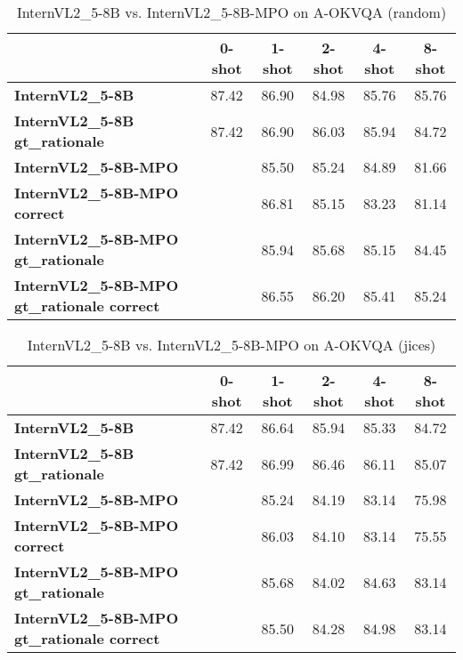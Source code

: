 \begin{table}
\caption{InternVL2\_5-8B vs. InternVL2\_5-8B-MPO on A-OKVQA (random)}
\label{tab:InternVL2_5-8B_A-OKVQA_TRAIN_random}
\begin{tabular}{lccccc}
\toprule
 & 0-shot & 1-shot & 2-shot & 4-shot & 8-shot \\
\midrule
\textbf{InternVL2\_5-8B} & 87.42 & 86.90 & 84.98 & 85.76 & 85.76 \\
\textbf{InternVL2\_5-8B gt\_rationale} & 87.42 & 86.90 & 86.03 & 85.94 & 84.72 \\
\textbf{InternVL2\_5-8B-MPO} &  & 85.50 & 85.24 & 84.89 & 81.66 \\
\textbf{InternVL2\_5-8B-MPO correct} &  & 86.81 & 85.15 & 83.23 & 81.14 \\
\textbf{InternVL2\_5-8B-MPO gt\_rationale} &  & 85.94 & 85.68 & 85.15 & 84.45 \\
\textbf{InternVL2\_5-8B-MPO gt\_rationale correct} &  & 86.55 & 86.20 & 85.41 & 85.24 \\
\bottomrule
\end{tabular}
\end{table}


\begin{table}
\caption{InternVL2\_5-8B vs. InternVL2\_5-8B-MPO on A-OKVQA (jices)}
\label{tab:InternVL2_5-8B_A-OKVQA_TRAIN_jices}
\begin{tabular}{lccccc}
\toprule
 & 0-shot & 1-shot & 2-shot & 4-shot & 8-shot \\
\midrule
\textbf{InternVL2\_5-8B} & 87.42 & 86.64 & 85.94 & 85.33 & 84.72 \\
\textbf{InternVL2\_5-8B gt\_rationale} & 87.42 & 86.99 & 86.46 & 86.11 & 85.07 \\
\textbf{InternVL2\_5-8B-MPO} &  & 85.24 & 84.19 & 83.14 & 75.98 \\
\textbf{InternVL2\_5-8B-MPO correct} &  & 86.03 & 84.10 & 83.14 & 75.55 \\
\textbf{InternVL2\_5-8B-MPO gt\_rationale} &  & 85.68 & 84.02 & 84.63 & 83.14 \\
\textbf{InternVL2\_5-8B-MPO gt\_rationale correct} &  & 85.50 & 84.28 & 84.98 & 83.14 \\
\bottomrule
\end{tabular}
\end{table}



